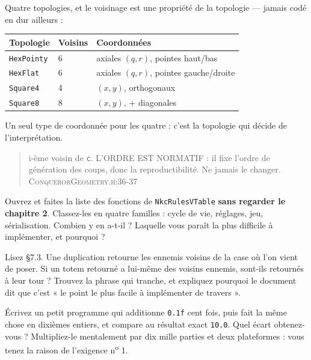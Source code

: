 Quatre topologies, et le voisinage est une propriété de la topologie — jamais
codé en dur ailleurs :

\begin{center}
\begin{tabular}{@{}lll@{}}
\toprule
\textbf{Topologie} & \textbf{Voisins} & \textbf{Coordonnées} \\
\midrule
\texttt{HexPointy} & 6 & axiales $(q, r)$, pointes haut/bas \\
\texttt{HexFlat}   & 6 & axiales $(q, r)$, pointes gauche/droite \\
\texttt{Square4}   & 4 & $(x, y)$, orthogonaux \\
\texttt{Square8}   & 8 & $(x, y)$, $+$ diagonales \\
\bottomrule
\end{tabular}
\end{center}

Un seul type de coordonnée pour les quatre : c'est la topologie qui décide de
l'interprétation.

\begin{nkpiege}
\begin{quote}\small
i-ème voisin de \texttt{c}. L'ORDRE EST NORMATIF : il fixe l'ordre de génération
des coups, donc la reproductibilité. Ne jamais le changer.
\hfill\textsc{ConquerorGeometry.h:36-37}
\end{quote}
\end{nkpiege}

\begin{nkexo}
Ouvrez  et faites la liste des fonctions de
\texttt{NkcRulesVTable} \textbf{sans regarder le chapitre 2}. Classez-les en
quatre familles : cycle de vie, réglages, jeu, sérialisation. Combien y en a-t-il ?
Laquelle vous paraît la plus difficile à implémenter, et pourquoi ?
\end{nkexo}

\begin{nkexo}[2 — La cascade]
Lisez  \S7.3. Une duplication retourne les
ennemis voisins de la case où l'on vient de poser. Si un totem retourné a
lui-même des voisins ennemis, sont-ils retournés à leur tour ? Trouvez la phrase
qui tranche, et expliquez pourquoi le document dit que c'est « le point le plus
facile à implémenter de travers ».
\end{nkexo}

\begin{nkexo}
Écrivez un petit programme qui additionne \texttt{0.1f} cent fois, puis fait la
même chose en dixièmes entiers, et compare au résultat exact \texttt{10.0}. Quel
écart obtenez-vous ? Multipliez-le mentalement par dix mille parties et deux
plateformes : vous tenez la raison de l'exigence n\textsuperscript{o} 1.
\end{nkexo}
